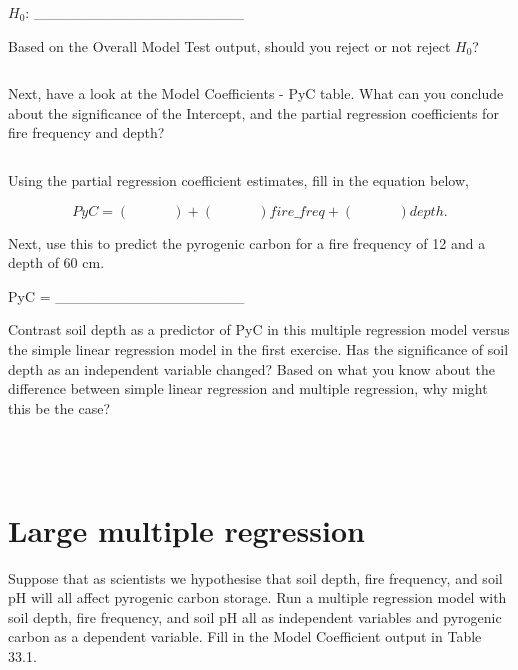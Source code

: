 \documentclass[
]{scrbook}
\begin{document}
\(H_{0}\): \_\_\_\_\_\_\_\_\_\_\_\_\_\_\_\_\_\_\_\_

Based on the Overall Model Test output, should you reject or not reject \(H_{0}\)?

\begin{verbatim}
\end{verbatim}

Next, have a look at the Model Coefficients - PyC table.
What can you conclude about the significance of the Intercept, and the partial regression coefficients for fire frequency and depth?

\begin{verbatim}

\end{verbatim}

Using the partial regression coefficient estimates, fill in the equation below,

\[PyC = (\:\:\:\:\:\:\:\:\:\:\:\:\:\:) + (\:\:\:\:\:\:\:\:\:\:\:\:\:\:)fire\_freq + (\:\:\:\:\:\:\:\:\:\:\:\:\:\:)depth.\]

Next, use this to predict the pyrogenic carbon for a fire frequency of 12 and a depth of 60 cm.

PyC = \_\_\_\_\_\_\_\_\_\_\_\_\_\_\_\_\_\_

Contrast soil depth as a predictor of PyC in this multiple regression model versus the simple linear regression model in the first exercise.
Has the significance of soil depth as an independent variable changed?
Based on what you know about the difference between simple linear regression and multiple regression, why might this be the case?

\begin{verbatim}



\end{verbatim}

\hypertarget{large-multiple-regression}{%
\section{Large multiple regression}\label{large-multiple-regression}}

Suppose that as scientists we hypothesise that soil depth, fire frequency, and soil pH will all affect pyrogenic carbon storage.
Run a multiple regression model with soil depth, fire frequency, and soil pH all as independent variables and pyrogenic carbon as a dependent variable.
Fill in the Model Coefficient output in Table 33.1.
\end{document}

